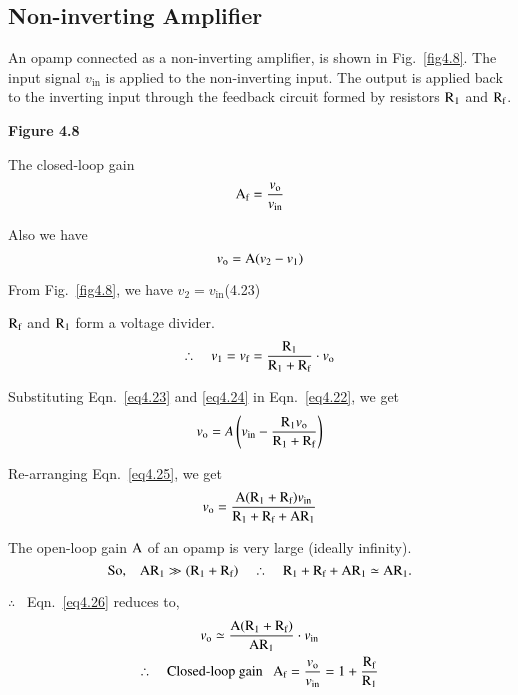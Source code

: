 \subsection{Non-inverting Amplifier}\label{sec4.6.2}

An opamp connected as a non-inverting amplifier, is shown in Fig.~\ref{fig4.8}. The input signal $v_{\text{in}}$ is applied to the non-inverting input. The output is applied back to the inverting input through the feedback circuit formed by resistors $\textrm{R}_{1}$ and $\textrm{R}_{\textrm{f}}$.
\begin{center}
{\bf Figure 4.8}
\end{center}

The closed-loop gain
\begin{equation}
\textrm{A}_{\textrm{f}}=\frac{v_{\textrm{o}}}{v_{\text{in}}}\label{eq4.21}
\end{equation}

Also we have
\begin{equation}
v_{\textrm{o}}=\textrm{A} (v_{2}-v_{1})\label{eq4.22}
\end{equation}

From Fig.~\ref{fig4.8}, we have $v_{2}=v_{\text{in}}$\hfill (4.23)

$\textrm{R}_{\textrm{f}}$ and $\textrm{R}_{1}$ form a voltage divider.
\setcounter{equation}{23}
\begin{equation}
\therefore\quad v_{1}=v_{\textrm{f}}=\dfrac{\textrm{R}_{1}}{\textrm{R}_{1}+\textrm{R}_{\textrm{f}}}\cdot v_{\textrm{o}}\label{eq4.24}
\end{equation}

Substituting Eqn.~\eqref{eq4.23} and \eqref{eq4.24} in Eqn.~\eqref{eq4.22}, we get
\begin{equation}
v_{\textrm{o}}=A\left(v_{\text{in}}-\dfrac{\textrm{R}_{1}v_{\textrm{o}}}{\textrm{R}_{1}+\textrm{R}_{\textrm{f}}}\right)\label{eq4.25}
\end{equation}

Re-arranging Eqn.~\eqref{eq4.25}, we get
\begin{equation}
v_{\textrm{o}}=\dfrac{\textrm{A} (\textrm{R}_{1}+\textrm{R}_{\textrm{f}})v_{\text{in}}}{\textrm{R}_{1}+\textrm{R}_{\textrm{f}}+\textrm{A}\textrm{R}_{1}}\label{eq4.26}
\end{equation}

The open-loop gain $\textrm{A}$ of an opamp is very large (ideally infinity).
$$
\text{So,}\quad \textrm{A}\textrm{R}_{1}\gg (\textrm{R}_{1}+\textrm{R}_{\textrm{f}})\quad\therefore\quad \textrm{R}_{1}+\textrm{R}_{\textrm{f}}+\textrm{A}\textrm{R}_{1}\simeq \textrm{A}\textrm{R}_{1}.
$$

$\therefore$~ Eqn.~\eqref{eq4.26} reduces to,
\begin{gather}
v_{\textrm{o}}\simeq \dfrac{\textrm{A}(\textrm{R}_{1}+\textrm{R}_{\textrm{f}})}{\textrm{A}\textrm{R}_{1}}\cdot v_{\text{in}}\notag\\
\therefore\quad \text{Closed-loop gain~~ } \textrm{A}_{\textrm{f}}=\frac{v_{\textrm{o}}}{v_{\text{in}}}=1+\frac{\textrm{R}_{\textrm{f}}}{\textrm{R}_{1}}\label{eq4.27}
\end{gather}


